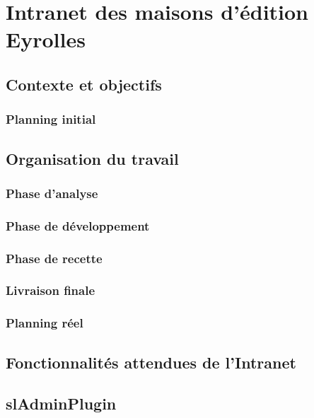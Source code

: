 \section{Intranet des maisons d'édition Eyrolles}

\subsection{Contexte et objectifs}

\subsubsection{Planning initial}

\subsection{Organisation du travail}

\subsubsection{Phase d'analyse}

\subsubsection{Phase de développement}

\subsubsection{Phase de recette}

\subsubsection{Livraison finale}

\subsubsection{Planning réel}

\subsection{Fonctionnalités attendues de l'Intranet}

\subsection{slAdminPlugin}

